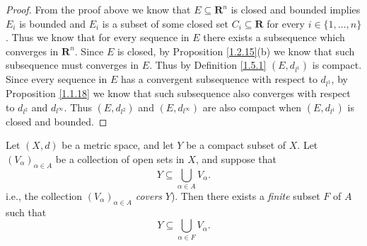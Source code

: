 \begin{proof}
    From the proof above we know that \(E \subseteq \mathbf{R}^n\) is closed and bounded implies \(E_i\) is bounded and \(E_i\) is a subset of some closed set \(C_i \subseteq \mathbf{R}\) for every \(i \in \{1, \dots, n\}\).
    Thus we know that for every sequence in \(E\) there exists a subsequence which converges in \(\mathbf{R}^n\).
    Since \(E\) is closed, by Proposition \ref{1.2.15}(b) we know that such subsequence must converges in \(E\).
    Thus by Definition \ref{1.5.1} \((E, d_{l^1})\) is compact.
    Since every sequence in \(E\) has a convergent subsequence with respect to \(d_{l^1}\), by Proposition \ref{1.1.18} we know that such subsequence also converges with respect to \(d_{l^2}\) and \(d_{l^\infty}\).
    Thus \((E, d_{l^2})\) and \((E, d_{l^\infty})\) are also compact when \((E, d_{l^1})\) is closed and bounded.
\end{proof}

\begin{theorem}\label{1.5.8}
    Let \((X, d)\) be a metric space, and let \(Y\) be a compact subset of \(X\).
    Let \((V_{\alpha})_{\alpha \in A}\) be a collection of open sets in \(X\), and suppose that
    \[
        Y \subseteq \bigcup_{\alpha \in A} V_{\alpha}.
    \]
    i.e., the collection \((V_{\alpha})_{\alpha \in A}\) \emph{covers} \(Y\)).
    Then there exists a \emph{finite} subset \(F\) of \(A\) such that
    \[
        Y \subseteq \bigcup_{\alpha \in F} V_{\alpha}.
    \]
\end{theorem}

